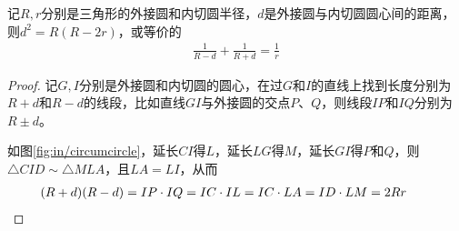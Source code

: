 \begin{theorem}[Euler定理]
  记$R,r$分别是三角形的外接圆和内切圆半径，$d$是外接圆与内切圆圆心间的距离，则$d^2=R(R-2r)$，或等价的
  \begin{align*}
    \frac1{R-d}+\frac1{R+d}=\frac1r
  \end{align*}
\end{theorem}
\begin{proof}
  记$G,I$分别是外接圆和内切圆的圆心，在过$G$和$I$的直线上找到长度分别为$R+d$和$R-d$的线段，比如直线$GI$与外接圆的交点$P$、$Q$，则线段$IP$和$IQ$分别为$R\pm d$。

  如图\ref{fig:in/circumcircle}，延长$CI$得$L$，延长$LG$得$M$，延长$GI$得$P$和$Q$，则$\triangle CID\sim\triangle MLA$，且$LA=LI$，从而
  \begin{align*}
    (R+d)(R-d)&=IP\cdot IQ=IC\cdot IL=IC\cdot LA=ID\cdot LM=2Rr&&\qedhere
  \end{align*}
\end{proof}

